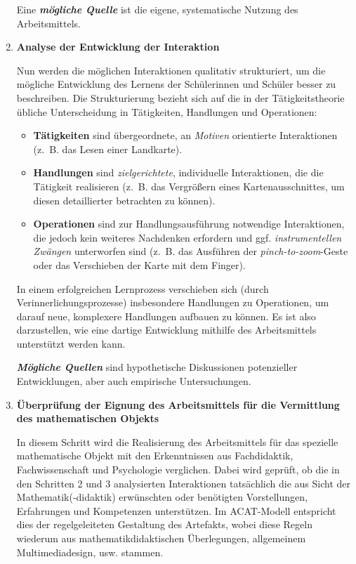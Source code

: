 \documentclass[
]{scrbook}
\providecommand{\tightlist}{%
  \setlength{\itemsep}{0pt}\setlength{\parskip}{0pt}}
\theoremstyle{definition}
\theoremstyle{definition}
\theoremstyle{definition}
\theoremstyle{definition}
\theoremstyle{remark}
\begin{document}
\begin{enumerate}
  Eine \textbf{\emph{mögliche Quelle}} ist die eigene, systematische Nutzung des Arbeitsmittels.
\item
  \textbf{Analyse der Entwicklung der Interaktion}

  Nun werden die möglichen Interaktionen qualitativ strukturiert, um die mögliche Entwicklung des Lernens der Schülerinnen und Schüler besser zu beschreiben. Die Strukturierung bezieht sich auf die in der Tätigkeitstheorie übliche Unterscheidung in Tätigkeiten, Handlungen und Operationen:

  \begin{itemize}
  \tightlist
  \item
    \textbf{Tätigkeiten} sind übergeordnete, an \emph{Motiven} orientierte Interaktionen (z.~B. das Lesen einer Landkarte).
  \item
    \textbf{Handlungen} sind \emph{zielgerichtete}, individuelle Interaktionen, die die Tätigkeit realisieren (z.~B. das Vergrößern eines Kartenausschnittes, um diesen detaillierter betrachten zu können).
  \item
    \textbf{Operationen} sind zur Handlungsausführung notwendige Interaktionen, die jedoch kein weiteres Nachdenken erfordern und ggf. \emph{instrumentellen Zwängen} unterworfen sind (z.~B. das Ausführen der \emph{pinch-to-zoom}-Geste oder das Verschieben der Karte mit dem Finger).
  \end{itemize}

  In einem erfolgreichen Lernprozess verschieben sich (durch Verinnerlichungsprozesse) insbesondere Handlungen zu Operationen, um darauf neue, komplexere Handlungen aufbauen zu können. Es ist also darzustellen, wie eine dartige Entwicklung mithilfe des Arbeitsmittels unterstützt werden kann.

  \textbf{\emph{Mögliche Quellen}} sind hypothetische Diskussionen potenzieller Entwicklungen, aber auch empirische Untersuchungen.
\item
  \textbf{Überprüfung der Eignung des Arbeitsmittels für die Vermittlung des mathematischen Objekts}

  In diesem Schritt wird die Realisierung des Arbeitsmittels für das spezielle mathematische Objekt mit den Erkenntnissen aus Fachdidaktik, Fachwissenschaft und Psychologie verglichen. Dabei wird geprüft, ob die in den Schritten 2 und 3 analysierten Interaktionen tatsächlich die aus Sicht der Mathematik(-didaktik) erwünschten oder benötigten Vorstellungen, Erfahrungen und Kompetenzen unterstützen. Im ACAT-Modell entspricht dies der regelgeleiteten Gestaltung des Artefakts, wobei diese Regeln wiederum aus mathematikdidaktischen Überlegungen, allgemeinem Multimediadesign, usw. stammen.


\end{enumerate}
\end{document}
